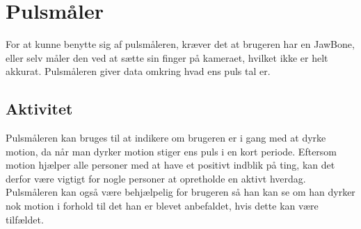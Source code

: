 \section{Pulsmåler}
For at kunne benytte sig af pulsmåleren, kræver det at brugeren har en JawBone, eller selv måler den ved at sætte sin finger på kameraet, hvilket ikke er helt akkurat.
Pulsmåleren giver data omkring hvad ens puls tal er.

\subsection{Aktivitet}
Pulsmåleren kan bruges til at indikere om brugeren er i gang med at dyrke motion, da når man dyrker motion stiger ens puls i en kort periode.
Eftersom motion hjælper alle personer med at have et positivt indblik på ting, kan det derfor være vigtigt for nogle personer at opretholde en aktivt hverdag.
Pulsmåleren kan også være behjælpelig for brugeren så han kan se om han dyrker nok motion i forhold til det han er blevet anbefaldet, hvis dette kan være tilfældet.



